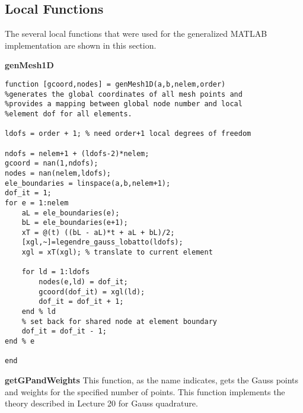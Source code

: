 \subsection{Local Functions}
The several local functions that were used for the generalized MATLAB implementation are shown in this section.

\vspace{0.25cm}

\noindent\textbf{genMesh1D}
\begin{lstlisting}[style=myMatlab,name=lec34n-ex2]
function [gcoord,nodes] = genMesh1D(a,b,nelem,order)
%generates the global coordinates of all mesh points and 
%provides a mapping between global node number and local
%element dof for all elements.

ldofs = order + 1; % need order+1 local degrees of freedom

ndofs = nelem+1 + (ldofs-2)*nelem;
gcoord = nan(1,ndofs);
nodes = nan(nelem,ldofs);
ele_boundaries = linspace(a,b,nelem+1);
dof_it = 1;
for e = 1:nelem 
    aL = ele_boundaries(e);
    bL = ele_boundaries(e+1);
    xT = @(t) ((bL - aL)*t + aL + bL)/2;
    [xgl,~]=legendre_gauss_lobatto(ldofs);
    xgl = xT(xgl); % translate to current element

    for ld = 1:ldofs
        nodes(e,ld) = dof_it;
        gcoord(dof_it) = xgl(ld);
        dof_it = dof_it + 1;
    end % ld
    % set back for shared node at element boundary
    dof_it = dof_it - 1; 
end % e

end
\end{lstlisting}

\vspace{0.25cm}

\noindent\textbf{getGPandWeights}
This function, as the name indicates, gets the Gauss points and weights for the specified number of points.  This function implements the theory described in Lecture 20 for Gauss quadrature.  

\vspace{0.1cm}


